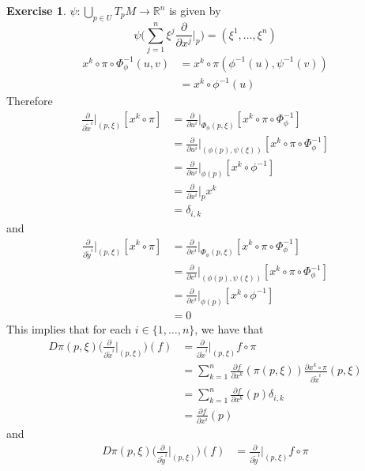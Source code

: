 \documentclass{book}
\theoremstyle{definition}
\newtheorem{ex}[definition]{Exercise}
\newcommand{\del}{\delta}
\newcommand{\R}{\mathbb{R}}
\DeclareMathOperator*{\0}{\mbf{0}}
\DeclareMathOperator*{\1}{\mbf{1}}
\newcommand{\p}{\partial}
\begin{document}
	\begin{ex}
		$\psi: \bigcup\limits_{p \in U} T_pM \rightarrow \R^n$ is given by 
		$$\psi \bigg (\sum_{j=1}^n \xi^j \frac{\p}{\p x^j} \bigg|_p \bigg) = (\xi^1, \ldots, \xi^n)$$
		\begin{align*}
			x^k \circ \pi \circ \Phi_{\phi}^{-1}(u,v)
			& =  x^k \circ \pi (\phi^{-1}(u), \psi^{-1}(v)) \\
			& = x^k \circ \phi^{-1}(u) 
		\end{align*}	
		Therefore
		\begin{align*}
			\frac{\p }{\p \tilde{x}^i} \bigg|_{(p,\xi)} [x^k \circ \pi  ]
			& = \frac{\p }{\p u^i} \bigg|_{\Phi_{\phi}(p,\xi)}[ x^k \circ \pi \circ \Phi_{\phi}^{-1} ]\\
			& = \frac{\p }{\p u^i} \bigg|_{(\phi(p), \psi(\xi))} [x^k \circ \pi \circ \Phi_{\phi}^{-1}] \\
			& = \frac{\p }{\p u^i} \bigg|_{\phi(p)}  [x^k \circ \phi^{-1}] \\
			& =  \frac{\p }{\p x^i} \bigg|_{p} x^k \\
			& = \del_{i,k}
		\end{align*}
		and 
		\begin{align*}
			\frac{\p }{\p \tilde{y}^i} \bigg|_{(p,\xi)} [x^k \circ \pi  ]
			& = \frac{\p }{\p v^i} \bigg|_{\Phi_{\phi}(p,\xi)}[ x^k \circ \pi \circ \Phi_{\phi}^{-1} ]\\
			& = \frac{\p }{\p v^i} \bigg|_{(\phi(p), \psi(\xi))} [x^k \circ \pi \circ \Phi_{\phi}^{-1}] \\
			& = \frac{\p }{\p v^i} \bigg|_{\phi(p)}  [x^k \circ \phi^{-1}] \\
			& = 0
		\end{align*}
		This implies that for each $i \in \{1, \ldots, n\}$, we have that 
		\begin{align*}
			D \pi (p, \xi) \bigg( \frac{\p}{\p \tilde{x}^i } \bigg|_{(p, \xi)} \bigg) (f)
			& = \frac{\p}{\p \tilde{x}^i} \bigg|_{(p, \xi)} f \circ \pi \\
			& = \sum_{k=1}^n \frac{\p f }{\p x^k}(\pi (p,\xi)) \frac{\p x^k \circ \pi }{\p \tilde{x}^i}(p,\xi) \\
			& = \sum_{k=1}^n \frac{\p f }{\p x^k}(p) \del_{i,k} \\
			& = \frac{\p f }{\p x^i}(p) 
		\end{align*}
		and 
		\begin{align*}
			D \pi (p, \xi) \bigg( \frac{\p}{\p \tilde{y}^i } \bigg|_{(p, \xi)} \bigg) (f)
			& = \frac{\p}{\p \tilde{y}^i} \bigg|_{(p, \xi)} f \circ \pi \\

\end{align*}
\end{ex}
\end{document}
